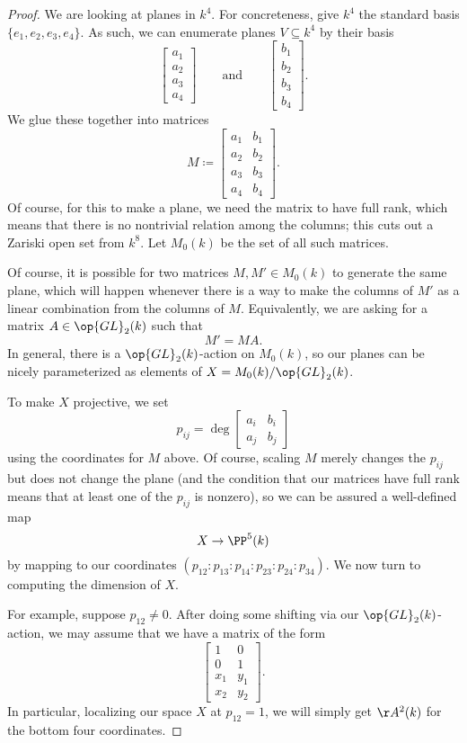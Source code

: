 \documentclass[../notes.tex]{subfiles}
\begin{document}
\begin{proof}
	We are looking at planes in $k^4$. For concreteness, give $k^4$ the standard basis $\{e_1,e_2,e_3,e_4\}$. As such, we can enumerate planes $V\subseteq k^4$ by their basis
	\[\begin{bmatrix}
		a_1 \\
		a_2 \\
		a_3 \\
		a_4
	\end{bmatrix}\qquad\text{and}\qquad\begin{bmatrix}
		b_1 \\
		b_2 \\
		b_3 \\
		b_4
	\end{bmatrix}.\]
	We glue these together into matrices
	\[M\coloneqq\begin{bmatrix}
		a_1 & b_1 \\
		a_2 & b_2 \\
		a_3 & b_3 \\
		a_4 & b_4
	\end{bmatrix}.\]
	Of course, for this to make a plane, we need the matrix to have full rank, which means that there is no nontrivial relation among the columns; this cuts out a Zariski open set from $k^8$. Let $M_0(k)$ be the set of all such matrices.

	Of course, it is possible for two matrices $M,M'\in M_0(k)$ to generate the same plane, which will happen whenever there is a way to make the columns of $M'$ as a linear combination from the columns of $M$. Equivalently, we are asking for a matrix $A\in\op{GL}_2(k)$ such that
	\[M'=MA.\]
	In general, there is a $\op{GL}_2(k)$-action on $M_0(k)$, so our planes can be nicely parameterized as elements of $X=M_0(k)/\op{GL}_2(k)$.

	To make $X$ projective, we set
	\[p_{ij}=\deg\begin{bmatrix}
		a_i & b_i \\
		a_j & b_j
	\end{bmatrix}\]
	using the coordinates for $M$ above. Of course, scaling $M$ merely changes the $p_{ij}$ but does not change the plane (and the condition that our matrices have full rank means that at least one of the $p_{ij}$ is nonzero), so we can be assured a well-defined map
	\[X\to\PP^5(k)\]
	by mapping to our coordinates $(p_{12}:p_{13}:p_{14}:p_{23}:p_{24}:p_{34})$. We now turn to computing the dimension of $X$.

	For example, suppose $p_{12}\ne0$. After doing some shifting via our $\op{GL}_2(k)$-action, we may assume that we have a matrix of the form
	\[\begin{bmatrix}
		1 & 0 \\
		0 & 1 \\
		x_1 & y_1 \\
		x_2 & y_2
	\end{bmatrix}.\]
	In particular, localizing our space $X$ at $p_{12}=1$, we will simply get $\AA^2(k)$ for the bottom four coordinates.
	

\end{proof}
\end{document}
